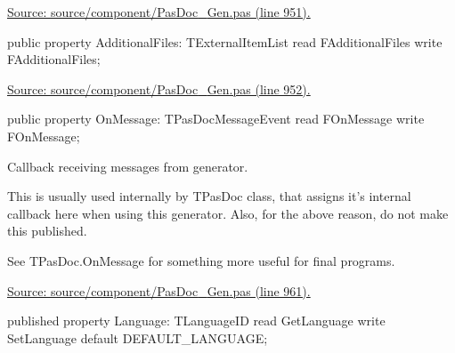 \documentclass{report}
\newif\ifpdf
\begin{document}
\begin{list}{}
\begin{flushleft}
\ifpdf
\end{flushleft}
\fi


\par  \par
\href{https://github.com/pasdoc/pasdoc/blob/master/source/component/PasDoc_Gen.pas#L951}{Source: source/component/PasDoc{\_}Gen.pas (line 951).}\label{PasDoc_Gen.TDocGenerator-AdditionalFiles}
\item[\textbf{AdditionalFiles}\hfill]
\ifpdf
\begin{flushleft}
\fi
\begin{ttfamily}
public property AdditionalFiles: TExternalItemList read FAdditionalFiles write FAdditionalFiles;\end{ttfamily}

\ifpdf
\end{flushleft}
\fi


\par  \par
\href{https://github.com/pasdoc/pasdoc/blob/master/source/component/PasDoc_Gen.pas#L952}{Source: source/component/PasDoc{\_}Gen.pas (line 952).}\label{PasDoc_Gen.TDocGenerator-OnMessage}
\item[\textbf{OnMessage}\hfill]
\ifpdf
\begin{flushleft}
\fi
\begin{ttfamily}
public property OnMessage: TPasDocMessageEvent read FOnMessage write FOnMessage;\end{ttfamily}

\ifpdf
\end{flushleft}
\fi


\par Callback receiving messages from generator.

This is usually used internally by TPasDoc class, that assigns it's internal callback here when using this generator. Also, for the above reason, do not make this published.

See TPasDoc.OnMessage for something more useful for final programs.\par
\href{https://github.com/pasdoc/pasdoc/blob/master/source/component/PasDoc_Gen.pas#L961}{Source: source/component/PasDoc{\_}Gen.pas (line 961).}\label{PasDoc_Gen.TDocGenerator-Language}
\item[\textbf{Language}\hfill]
\ifpdf
\begin{flushleft}
\fi
\begin{ttfamily}
published property Language: TLanguageID read GetLanguage write SetLanguage
      default DEFAULT{\_}LANGUAGE;\end{ttfamily}


\end{flushleft}
\end{list}
\end{document}
